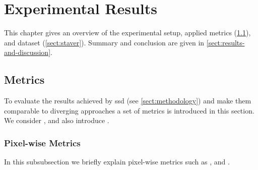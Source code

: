 \section{Experimental Results}
This chapter gives an overview of the experimental setup, applied metrics
(\cref{sect:metrics}), and dataset (\cref{sect:staver}). Summary and conclusion
are given in \cref{sect:results-and-discussion}.

\subsection{Metrics}\label{sect:metrics}
To evaluate the results achieved by \gls{ssd} (see \cref{sect:methodology}) and
make them comparable to diverging approaches a set of metrics is introduced in
this section. We consider , 
and also introduce .

\subsubsection{Pixel-wise Metrics}\label{subsect:pixel-wise-metrics}
In this subsubsection we briefly explain pixel-wise metrics such as
,  and .

